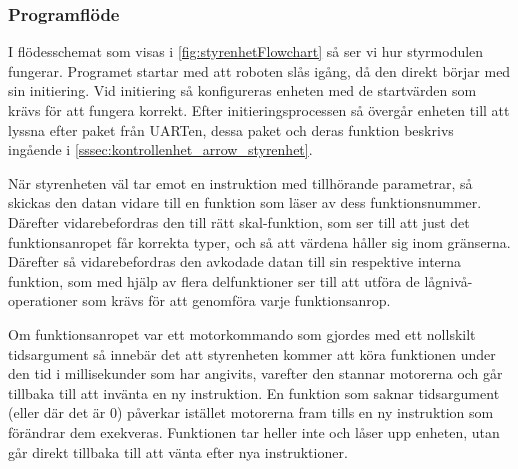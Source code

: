 \documentclass[a4paper,11pt]{article}
\begin{document}
\subsubsection{Programflöde}
I flödesschemat som visas i \ref{fig:styrenhetFlowchart} så ser vi hur styrmodulen fungerar. Programet startar med att roboten slås igång, då den direkt börjar med sin initiering. Vid initiering så konfigureras enheten med de startvärden som krävs för att fungera korrekt. Efter initieringsprocessen så övergår enheten till att lyssna efter paket från UARTen, dessa paket och deras funktion beskrivs ingående i \ref{sssec:kontrollenhet_arrow_styrenhet}. 

När styrenheten väl tar emot en instruktion med tillhörande parametrar, så skickas den datan vidare till en funktion som läser av dess funktionsnummer. Därefter vidarebefordras den till rätt skal-funktion, som ser till att just det funktionsanropet får korrekta typer, och så att värdena håller sig inom gränserna. Därefter så vidarebefordras den avkodade datan till sin respektive interna funktion, som med hjälp av flera delfunktioner ser till att utföra de lågnivå-operationer som krävs för att genomföra varje funktionsanrop. 

Om funktionsanropet var ett motorkommando som gjordes med ett nollskilt tidsargument så innebär det att styrenheten kommer att köra funktionen under den tid i millisekunder som har angivits, varefter den stannar motorerna och går tillbaka till att invänta en ny instruktion. En funktion som saknar tidsargument (eller där det är $0$) påverkar istället motorerna fram tills en ny instruktion som förändrar dem exekveras. Funktionen tar heller inte och låser upp enheten, utan går direkt tillbaka till att vänta efter nya instruktioner.
\end{document}
